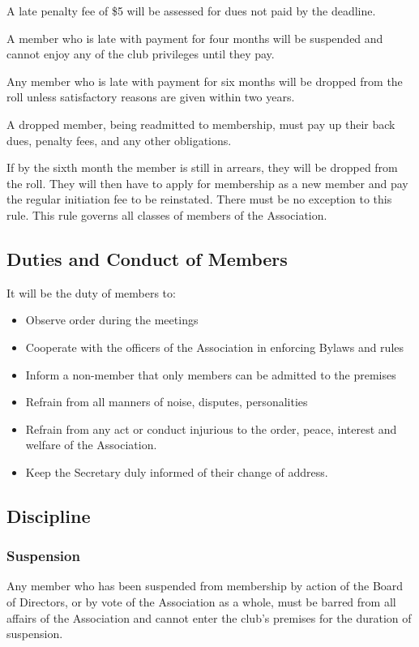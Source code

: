 \documentclass[12pt,letterpaper]{article}
\begin{document}
A late penalty fee of \$5 will be assessed for dues not paid by the deadline.

A member who is late with payment for four months will be suspended and cannot enjoy any of the club privileges until they pay.

Any member who is late with payment for six months will be dropped from the roll unless satisfactory reasons are given within two years.

A dropped member, being readmitted to membership, must pay up their back dues, penalty fees, and any other obligations.

If by the sixth month the member is still in arrears, they will be dropped from the roll. They will then have to apply for membership as a new member and pay the regular initiation fee to be reinstated. There must be no exception to this rule. This rule governs all classes of members of the Association. 

\subsection{Duties and Conduct of Members}
It will be the duty of members to:
\begin{itemize}
\item Observe order during the meetings
\item Cooperate with the officers of the Association in enforcing Bylaws and rules
\item Inform a non-member that only members can be admitted to the premises
\item Refrain from all manners of noise, disputes, personalities
\item Refrain from any act or conduct injurious to the order, peace, interest and welfare of the Association.
\item Keep the Secretary duly informed of their change of address. 
\end{itemize}

\subsection{Discipline}

\subsubsection{Suspension}
Any member who has been suspended from membership by action of the Board of Directors, or by vote of the Association as a whole, must be barred from all affairs of the Association and cannot enter the club's premises for the duration of suspension.
\end{document}

